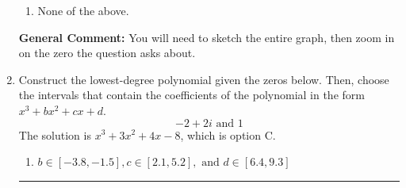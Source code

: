\documentclass{extbook}[14pt]
\newcommand{\litem}[1]{\item #1

\rule{\textwidth}{0.4pt}}
\begin{document}
\begin{enumerate}
{\begin{enumerate}[label=\Alph*.]
\item None of the above.\end{enumerate}
\textbf{General Comment:} You will need to sketch the entire graph, then zoom in on the zero the question asks about.
}
\litem{
Construct the lowest-degree polynomial given the zeros below. Then, choose the intervals that contain the coefficients of the polynomial in the form $x^3+bx^2+cx+d$.
\[ -2 + 2 i \text{ and } 1 \]The solution is \( x^{3} +3 x^{2} +4 x -8 \), which is option C.\begin{enumerate}[label=\Alph*.]
\item \( b \in [-3.8, -1.5], c \in [2.1, 5.2], \text{ and } d \in [6.4, 9.3] \)


\end{enumerate}}
\end{enumerate}
\end{document}
